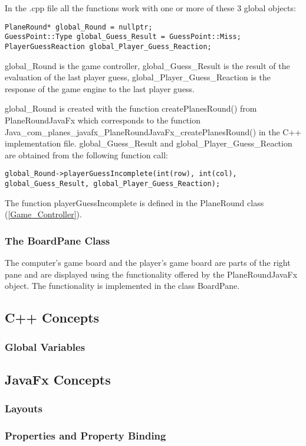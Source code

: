 In the .cpp file all the functions work with one or more of these 3 global objects:

\begin{lstlisting}
PlaneRound* global_Round = nullptr;
GuessPoint::Type global_Guess_Result = GuessPoint::Miss;
PlayerGuessReaction global_Player_Guess_Reaction;
\end{lstlisting}

global\_Round is the game controller, global\_Guess\_Result is the result of the evaluation of the last player guess, global\_Player\_Guess\_Reaction is the response of the game engine to the last player guess. 

global\_Round is created with the function createPlanesRound() from PlaneRoundJavaFx which corresponds to the function\\ Java\_com\_planes\_javafx\_PlaneRoundJavaFx\_createPlanesRound() in the C++ implementation file. global\_Guess\_Result and global\_Player\_Guess\_Reaction are obtained from the following function call:

\begin{lstlisting}
global_Round->playerGuessIncomplete(int(row), int(col), global_Guess_Result, global_Player_Guess_Reaction);
\end{lstlisting}

The function playerGuessIncomplete is defined in the PlaneRound class (\ref{Game_Controller}).

\subsubsection {The BoardPane Class}

The computer's game board and the player's game board are parts of the right pane and are displayed using the functionality offered by the PlaneRoundJavaFx object. The functionality is implemented in the class BoardPane.

\subsection{C++ Concepts}

\subsubsection{Global Variables} 

\subsection{JavaFx Concepts}

\subsubsection{Layouts}
\subsubsection{Properties and Property Binding}
